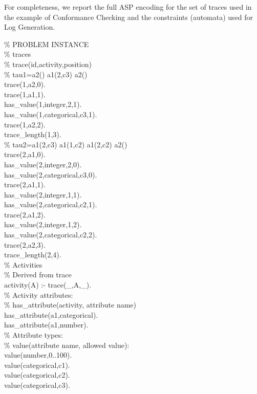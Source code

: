 For completeness, we report the full 
ASP encoding for the set of traces used in the example of Conformance Checking 
and the constraints (automata) used for Log Generation.\\

\begin{small}
\begin{aspcode}
\noindent
\% PROBLEM INSTANCE\\

\noindent
\% traces\\
\% trace(id,activity,position)\\

\noindent
\% tau1=a2() a1(2,c3) a2()\\
trace(1,a2,0).\\
trace(1,a1,1).\\
has\_value(1,integer,2,1).\\
has\_value(1,categorical,c3,1).\\
trace(1,a2,2).\\
trace\_length(1,3).\\

\noindent
\% tau2=a1(2,c3) a1(1,c2) a1(2,c2) a2()\\
trace(2,a1,0).\\
has\_value(2,integer,2,0).\\
has\_value(2,categorical,c3,0).\\
trace(2,a1,1).\\
has\_value(2,integer,1,1).\\
has\_value(2,categorical,c2,1).\\
trace(2,a1,2).\\
has\_value(2,integer,1,2).\\
has\_value(2,categorical,c2,2).\\
trace(2,a2,3).\\
trace\_length(2,4).\\

\noindent\% Activities\\
\% Derived from trace\\
activity(A) :- trace(\_,A,\_).\\

\noindent
\% Activity attributes:\\
\% has\_attribute(activity, attribute name)\\
has\_attribute(a1,categorical).\\
has\_attribute(a1,number).\\

\noindent
\% Attribute types:\\
\% value(attribute name, allowed value):\\
value(number,0..100).\\
value(categorical,c1).\\
value(categorical,c2).\\
value(categorical,c3).\\


\end{aspcode}
\end{small}
